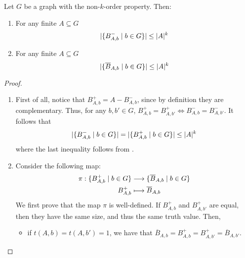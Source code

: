         \begin{corollary}[Claim 2.6.1] \label{cor:k_order_propery_bounds_BAbs}
            Let $G$ be a graph with the non-$k$-order property.
            Then:
            \begin{enumerate}
                \item\label{itm:k_order_propery_bounds_BAbs.1} For any finite $A \subseteq G$
                    \[
                        | \{ B^-_{A,b} \mid b \in G \} |
                            \leq |A|^k
                    \]
                \item\label{itm:k_order_propery_bounds_BAbs.2} For any finite $A \subseteq G$
                    \[
                        | \{ \overline{B}_{A,b} \mid b \in G \} |
                            \leq |A|^k
                    \]
            \end{enumerate}
            \begin{proof}
                \begin{enumerate}
                    \item First of all, notice that $B^+_{A,b} = A - B^-_{A,b}$, since by definition they are complementary.
                        Thus, for any $b, b' \in G$, $B^+_{A,b} = B^+_{A,b'} \Leftrightarrow B^-_{A,b} = B^-_{A,b'}$.
                        It follows that
                        \[
                            | \{ B^-_{A,b} \mid b \in G \} | =
                            | \{ B^+_{A,b} \mid b \in G \} | \leq |A|^k
                        \]
                        where the last inequality follows from .
                    \item Consider the following map:
                        \begin{align*}
                            \pi: \{ B^+_{A,b} \mid b \in G \} & \longrightarrow \{ \overline{B}_{A,b} \mid b \in G \} \\
                                                         B^+_{A,b} & \longmapsto \overline{B}_{A,b}
                        \end{align*}
                        We first prove that the map $\pi$ is well-defined.
                        If $B^+_{A,b}$ and $B^+_{A,b'}$ are equal, then they have the same size, and thus the same truth value.
                        Then,
                        \begin{itemize}
                            \item if $t(A,b) = t(A,b') = 1$, we have that $\overline{B}_{A,b} = B^+_{A,b} = B^+_{A,b'} = \overline{B}_{A,b'}$.

\end{itemize}
\end{enumerate}
\end{proof}
\end{corollary}
